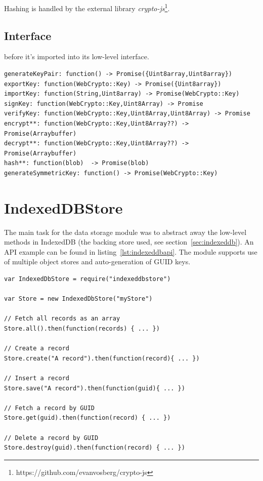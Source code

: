 Hashing is handled by the external library \emph{crypto-js}\footnote{https://github.com/evanvosberg/crypto-js}.

\subsection{Interface}
before it's imported into its low-level interface. %
\begin{Code}
\begin{lstlisting}[caption={Common database operations}, label={lst:cryptointerface}]
generateKeyPair: function() -> Promise({Uint8array,Uint8array})
exportKey: function(WebCrypto::Key) -> Promise({Uint8array})
importKey: function(String,Uint8array) -> Promise(WebCrypto::Key)
signKey: function(WebCrypto::Key,Uint8Array) -> Promise
verifyKey: function(WebCrypto::Key,Uint8Array,Uint8Array) -> Promise
encrypt**: function(WebCrypto::Key,Uint8Array??) -> Promise(Arraybuffer)
decrypt**: function(WebCrypto::Key,Uint8Array??) -> Promise(Arraybuffer)
hash**: function(blob)  -> Promise(blob)
generateSymmetricKey: function() -> Promise(WebCrypto::Key)
\end{lstlisting}
\end{Code}

\section{IndexedDBStore}
\label{sec:indexeddbstore}

The main task for the data storage module was to abstract away the low-level methods in IndexedDB (the backing store used, see section~\ref{sec:indexeddb}). An API example can be found in listing~\ref{lst:indexeddbapi}. The module supports use of multiple object stores and auto-generation of GUID keys.

\begin{Code}
\begin{lstlisting}[caption={Common database operations}, label={lst:indexeddbapi}]
var IndexedDbStore = require("indexeddbstore")

var Store = new IndexedDbStore("myStore")

// Fetch all records as an array
Store.all().then(function(records) { ... })

// Create a record
Store.create("A record").then(function(record){ ... })

// Insert a record
Store.save("A record").then(function(guid){ ... })

// Fetch a record by GUID
Store.get(guid).then(function(record) { ... })

// Delete a record by GUID
Store.destroy(guid).then(function(record) { ... })
\end{lstlisting}
\end{Code}

